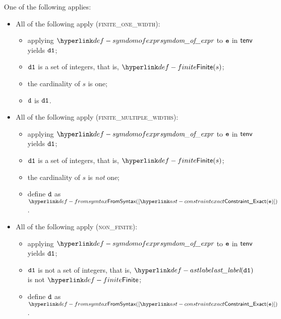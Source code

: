 \ProseParagraph
One of the following applies:
\begin{itemize}
  \item All of the following apply (\textsc{finite\_one\_width}):
  \begin{itemize}
    \item applying $\symdomofexpr$ to $\ve$ in $\tenv$ yields $\vdone$;
    \item $\vdone$ is a set of integers, that is, $\Finite(s)$;
    \item the cardinality of $s$ is one;
    \item $\vd$ is $\vdone$.
  \end{itemize}

  \item All of the following apply (\textsc{finite\_multiple\_widths}):
  \begin{itemize}
    \item applying $\symdomofexpr$ to $\ve$ in $\tenv$ yields $\vdone$;
    \item $\vdone$ is a set of integers, that is, $\Finite(s)$;
    \item the cardinality of $s$ is \emph{not} one;
    \item define $\vd$ as $\FromSyntax([\ConstraintExact(\ve)])$.
  \end{itemize}

  \item All of the following apply (\textsc{non\_finite}):
  \begin{itemize}
    \item applying $\symdomofexpr$ to $\ve$ in $\tenv$ yields $\vdone$;
    \item $\vdone$ is not a set of integers, that is, $\astlabel(\vdone)$ is not $\Finite$;
    \item define $\vd$ as $\FromSyntax([\ConstraintExact(\ve)])$.
  \end{itemize}
\end{itemize}

\FormallyParagraph
\begin{mathpar}
\end{mathpar}

\begin{mathpar}
\end{mathpar}

